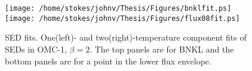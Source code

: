 \begin{figure}
\begin{center}
\texttt{[image: /home/stokes/johnv/Thesis/Figures/bnklfit.ps]}
\texttt{[image: /home/stokes/johnv/Thesis/Figures/flux08fit.ps]}
\end{center}
\caption[SED fits] {SED fits.  One(left)- and two(right)-temperature
component fits of SEDs in OMC-1, $\beta=2$.  The top panels are for
BNKL and the bottom panels are for a point in the lower flux envelope.
\label{fig-fits}}
\end{figure}


